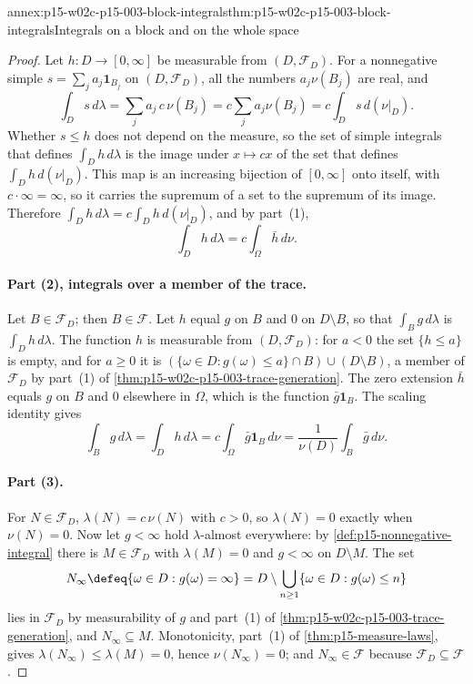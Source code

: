 \begin{annexitem}{annex:p15-w02c-p15-003-block-integrals}{thm:p15-w02c-p15-003-block-integrals}{Integrals on a block and on the whole space}
\begin{proof}
Let \(h:D\to[0,\infty]\) be measurable from \((D,\mathcal F_D)\). For a
nonnegative simple \(s=\sum_ja_j\mathbf1_{B_j}\) on \((D,\mathcal F_D)\),
all the numbers \(a_j\nu(B_j)\) are real, and
\[
 \int_Ds\,d\lambda=\sum_ja_j\,c\,\nu(B_j)=c\sum_ja_j\nu(B_j)
  =c\int_Ds\,d(\nu|_D).
\]
Whether \(s\leq h\) does not depend on the measure, so the set of simple
integrals that defines \(\int_Dh\,d\lambda\) is the image under
\(x\mapsto cx\) of the set that defines \(\int_Dh\,d(\nu|_D)\). This map is
an increasing bijection of \([0,\infty]\) onto itself, with
\(c\cdot\infty=\infty\), so it carries the supremum of a set to the
supremum of its image. Therefore
\(\int_Dh\,d\lambda=c\int_Dh\,d(\nu|_D)\), and by part~(1),
\[
 \int_Dh\,d\lambda=c\int_\Omega\bar h\,d\nu.
\]

\paragraph{Part (2), integrals over a member of the trace.}
Let \(B\in\mathcal F_D\); then \(B\in\mathcal F\). Let \(h\) equal \(g\) on
\(B\) and \(0\) on \(D\setminus B\), so that \(\int_Bg\,d\lambda\) is
\(\int_Dh\,d\lambda\). The function \(h\) is measurable from
\((D,\mathcal F_D)\): for \(a<0\) the set \(\{h\leq a\}\) is empty, and for
\(a\geq0\) it is \((\{\omega\in D:g(\omega)\leq a\}\cap B)\cup(D\setminus B)\),
a member of \(\mathcal F_D\) by part~(1) of
\cref{thm:p15-w02c-p15-003-trace-generation}. The zero extension
\(\bar h\) equals \(g\) on \(B\) and \(0\) elsewhere in \(\Omega\), which is
the function \(\bar g\mathbf1_B\). The scaling identity gives
\[
 \int_Bg\,d\lambda=\int_Dh\,d\lambda=c\int_\Omega\bar g\mathbf1_B\,d\nu
  =\frac1{\nu(D)}\int_B\bar g\,d\nu .
\]

\paragraph{Part (3).}
For \(N\in\mathcal F_D\), \(\lambda(N)=c\,\nu(N)\) with \(c>0\), so
\(\lambda(N)=0\) exactly when \(\nu(N)=0\). Now let \(g<\infty\) hold
\(\lambda\)-almost everywhere: by \cref{def:p15-nonnegative-integral}
there is \(M\in\mathcal F_D\) with \(\lambda(M)=0\) and \(g<\infty\) on
\(D\setminus M\). The set
\[
 N_\infty\defeq\{\omega\in D:g(\omega)=\infty\}
  =D\setminus\bigcup_{n\geq1}\{\omega\in D:g(\omega)\leq n\}
\]
lies in \(\mathcal F_D\) by measurability of \(g\) and part~(1) of
\cref{thm:p15-w02c-p15-003-trace-generation}, and \(N_\infty\subseteq M\).
Monotonicity, part~(1) of \cref{thm:p15-measure-laws}, gives
\(\lambda(N_\infty)\leq\lambda(M)=0\), hence \(\nu(N_\infty)=0\); and
\(N_\infty\in\mathcal F\) because \(\mathcal F_D\subseteq\mathcal F\).
\end{proof}
\end{annexitem}

